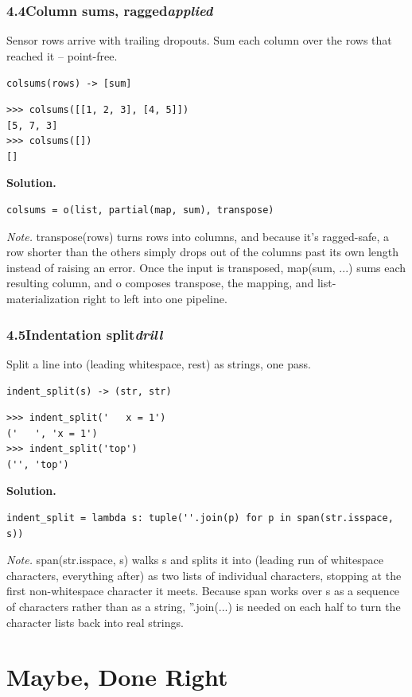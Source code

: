 \documentclass[10pt,letterpaper]{book}
\begin{document}
\subsection*{4.4\quad Column sums, ragged\hfill\textnormal{\textit{applied}}}
Sensor rows arrive with trailing dropouts. Sum each column over the rows that reached it -- point-free.

\noindent\texttt{colsums(rows) -> [sum]}
\begin{lstlisting}[style=ex]
>>> colsums([[1, 2, 3], [4, 5]])
[5, 7, 3]
>>> colsums([])
[]
\end{lstlisting}
\noindent\textbf{Solution.}
\begin{lstlisting}[style=code]
colsums = o(list, partial(map, sum), transpose)
\end{lstlisting}
\noindent\textit{Note.} transpose(rows) turns rows into columns, and because it's ragged-safe, a row shorter than the others simply drops out of the columns past its own length instead of raising an error. Once the input is transposed, map(sum, ...) sums each resulting column, and o composes transpose, the mapping, and list-materialization right to left into one pipeline.

\subsection*{4.5\quad Indentation split\hfill\textnormal{\textit{drill}}}
Split a line into (leading whitespace, rest) as strings, one pass.

\noindent\texttt{indent\_split(s) -> (str, str)}
\begin{lstlisting}[style=ex]
>>> indent_split('   x = 1')
('   ', 'x = 1')
>>> indent_split('top')
('', 'top')
\end{lstlisting}
\noindent\textbf{Solution.}
\begin{lstlisting}[style=code]
indent_split = lambda s: tuple(''.join(p) for p in span(str.isspace, s))
\end{lstlisting}
\noindent\textit{Note.} span(str.isspace, s) walks s and splits it into (leading run of whitespace characters, everything after) as two lists of individual characters, stopping at the first non-whitespace character it meets. Because span works over s as a sequence of characters rather than as a string, ''.join(...) is needed on each half to turn the character lists back into real strings.

\clearpage
\chapter{Maybe, Done Right}
\end{document}
